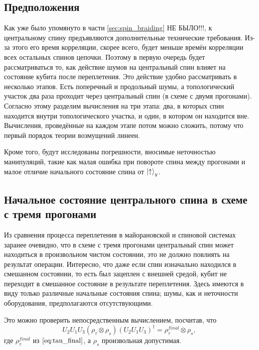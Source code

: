 \documentclass[a4paper,12pt]{article}
\theoremstyle{plain} %
\theoremstyle{definition} %
\theoremstyle{remark} %
\begin{document}
\subsection{Предположения}
Как уже было упомянуто в части \ref{sec:spin_braiding} {\color{red}НЕ БЫЛО!!!}, к центральному спину предъявляются дополнительные технические требования. 
Из-за этого его время корреляции, скорее всего, будет меньше времён корреляции всех остальных спинов цепочки. 
Поэтому в первую очередь будет рассматриваться то, как действие шумов на центральный спин влияет на состояние кубита после переплетения. 
Это действие удобно рассматривать в несколько этапов. 
Есть поперечный и продольный шумы, а топологический участок два раза проходит через центральный спин (в схеме с двумя прогонами).
Согласно этому разделим вычисления на три этапа: два, в которых спин находится внутри топологического участка, и один, в котором он находится вне. Вычисления, проведённые на каждом этапе потом можно сложить, потому что первый порядок теории возмущений линеен.

Кроме того, будут исследованы погрешности, вносимые неточностью манипуляций, такие как малая ошибка при повороте спина между прогонами и малое отличие начального состояние спина от $\ket{\uparrow}_y$.

\subsection{Начальное состояние центрального спина в схеме с тремя прогонами}

Из сравнения процесса переплетения в майорановской и спиновой системах заранее очевидно, что в схеме с тремя прогонами центральный спин может находиться в произвольном чистом состоянии, это не должно повлиять на результат операции.
Интересно, что даже если спин изначально находился в смешанном состоянии, то есть был зацеплен с внешней средой, кубит не переходит в смешанное состояние в результате переплетения. 
Здесь имеются в виду только различные начальные состояния спина; шумы, как и неточности оборудования, предполагаются отсутствующими.

Это можно проверить непосредственным вычислением, посчитав, что
\begin{equation}
    U_2 U_1 U_3 (\rho_\tau \otimes \rho_s) (U_2 U_1 U_3)^\dagger = \rho^{final}_\tau \otimes \rho_s
    \label{eq:u213_general},
\end{equation}
где $\rho^{final}_\tau$ из $\ref{eq:tau_final}$, а $\rho_s$ произвольная допустимая.
\end{document}
